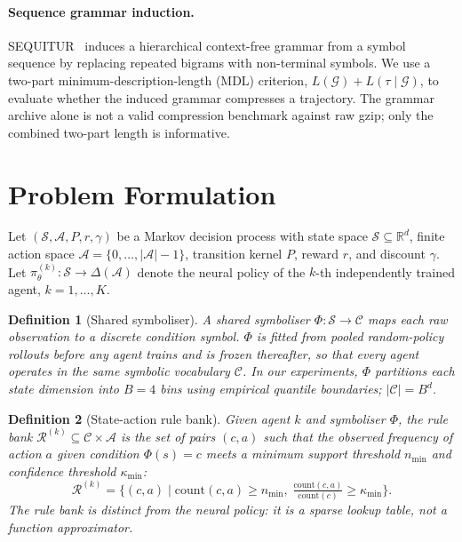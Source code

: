 \documentclass[12pt]{article}
\newtheorem{definition}{Definition}
\newcommand{\cS}{\mathcal{S}}       %
\newcommand{\cA}{\mathcal{A}}       %
\newcommand{\cC}{\mathcal{C}}       %
\newcommand{\cR}{\mathcal{R}}       %
\newcommand{\cG}{\mathcal{G}}       %
\newcommand{\piN}{\pi_{\theta}}     %
\begin{document}
\paragraph{Sequence grammar induction.}
SEQUITUR~\citep{nevill1997sequitur} induces a hierarchical context-free
grammar from a symbol sequence by replacing repeated bigrams with
non-terminal symbols.
We use a two-part minimum-description-length (MDL) criterion,
$L(\cG) + L(\tau \mid \cG)$, to evaluate whether the induced grammar
compresses a trajectory.
The grammar archive alone is not a valid compression benchmark against
raw gzip; only the combined two-part length is informative.

\section{Problem Formulation}
\label{sec:problem}

Let $(\cS, \cA, P, r, \gamma)$ be a Markov decision process with
state space $\cS \subseteq \mathbb{R}^d$, finite action space
$\cA = \{0,\ldots,|\cA|-1\}$, transition kernel $P$, reward $r$, and
discount $\gamma$.
Let $\piN^{(k)} : \cS \to \Delta(\cA)$ denote the neural policy of the
$k$-th independently trained agent, $k = 1,\ldots,K$.

\begin{definition}[Shared symboliser]
\label{def:symboliser}
A shared symboliser $\Phi : \cS \to \cC$ maps each raw observation to a
discrete condition symbol.
$\Phi$ is fitted from pooled random-policy rollouts before any agent trains
and is frozen thereafter, so that every agent operates in the same symbolic
vocabulary $\cC$.
In our experiments, $\Phi$ partitions each state dimension into $B = 4$ bins
using empirical quantile boundaries; $|\cC| = B^d$.
\end{definition}

\begin{definition}[State-action rule bank]
\label{def:rulebank}
Given agent $k$ and symboliser $\Phi$, the rule bank
$\cR^{(k)} \subseteq \cC \times \cA$ is the set of pairs $(c, a)$ such that
the observed frequency of action $a$ given condition $\Phi(s) = c$ meets
a minimum support threshold $n_{\min}$ and confidence threshold
$\kappa_{\min}$:
\begin{equation}
\label{eq:rulebank}
\cR^{(k)} = \bigl\{(c, a) \mid
  \mathrm{count}(c, a) \ge n_{\min},\;
  \tfrac{\mathrm{count}(c,a)}{\mathrm{count}(c)} \ge \kappa_{\min}\bigr\}.
\end{equation}
The rule bank is distinct from the neural policy: it is a sparse lookup
table, not a function approximator.
\end{definition}
\end{document}
